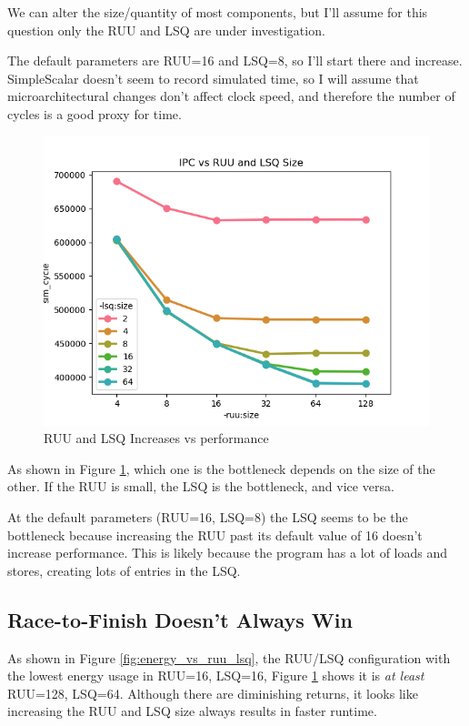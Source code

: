 \documentclass{article}
\begin{document}
\begin{multicols}{2}
  We can alter the size/quantity of most components, but I'll assume for this question only the RUU and LSQ are under investigation.

  The default parameters are RUU=16 and LSQ=8, so I'll start there and increase. SimpleScalar doesn't seem to record simulated time, so I will assume that microarchitectural changes don't affect clock speed, and therefore the number of cycles is a good proxy for time.

  \begin{figure}[H]
    \centering
    \includegraphics[width=\linewidth]{./assets/ruu_and_lsq_vs_sim_time.png}
    \caption{RUU and LSQ Increases vs performance}
    \label{fig:ruu_or_lsq_bottleneck}
  \end{figure}

  As shown in Figure \ref{fig:ruu_or_lsq_bottleneck}, which one is the bottleneck depends on the size of the other. If the RUU is small, the LSQ is the bottleneck, and vice versa.

  At the default parameters (RUU=16, LSQ=8) the LSQ seems to be the bottleneck because increasing the RUU past its default value of 16 doesn't increase performance. This is likely because the program has a lot of loads and stores, creating lots of entries in the LSQ.

  \subsection{Race-to-Finish Doesn't Always Win}
  As shown in Figure \ref{fig:energy_vs_ruu_lsq}, the RUU/LSQ configuration with the lowest energy usage in RUU=16, LSQ=16, Figure \ref{fig:ruu_or_lsq_bottleneck} shows it is \textit{at least} RUU=128, LSQ=64. Although there are diminishing returns, it looks like increasing the RUU and LSQ size always results in faster runtime.


\end{multicols}
\end{document}
